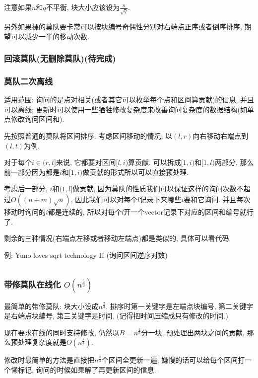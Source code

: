 注意如果$n$和$q$不平衡, 块大小应该设为$\frac n {\sqrt q}$.

另外如果裸的莫队要卡常可以按块编号奇偶性分别对右端点正序或者倒序排序, 期望可以减少一半的移动次数.


\subsubsection{回滚莫队(无删除莫队)(待完成)}

\subsubsection{莫队二次离线}

适用范围: 询问的是点对相关(或者其它可以枚举每个点和区间算贡献)的信息, 并且可以离线; 更新时可以使用一些牺牲修改复杂度来改善询问复杂度的数据结构(如单点修改询问区间和).

先按照普通的莫队将区间排序. 考虑区间移动的情况, 以$(l, r)$向右移动右端点到$(l, t)$为例.

对于每个$i \in (r, t]$来说, 它都要对区间$[l, i)$算贡献. 可以拆成$[1, i)$和$[1, l)$两部分, 那么前一部分因为都是$i$和$[1, i)$做贡献的形式所以可以直接预处理.

考虑后一部分, $i$和$(1, l]$做贡献, 因为莫队的性质我们可以保证这样的询问次数不超过$O((n + m)\sqrt n)$, 因此我们可以对每个$l$记录下来哪些$i$要和它询问. 并且每次移动时询问的$i$都是连续的, 所以对每个$l$开一个vector记录下对应的区间和编号就行了.

剩余的三种情况(右端点左移或者移动左端点)都是类似的, 具体可以看代码.

例: Yuno loves sqrt technology II (询问区间逆序对数)

\inputminted{cpp}{../src/datastructure/莫队二次离线.cpp}

\subsubsection{带修莫队在线化 $O(n ^ {\frac 5 3})$}

最简单的带修莫队: 块大小设成$n^{\frac 2 3}$, 排序时第一关键字是左端点块编号, 第二关键字是右端点块编号, 第三关键字是时间. (记得把时间压缩成只有修改的时间.)

现在要求在线的同时支持修改, 仍然以$B = n^{\frac 2 3}$分一块, 预处理出两块之间的贡献, 那么预处理复杂度就是$O(n ^ {\frac 5 3})$.

修改时最简单的方法是直接把$n^{\frac 2 3}$个区间全更新一遍. 嫌慢的话可以给每个区间打一个懒标记, 询问的时候如果解了再更新区间的信息.

